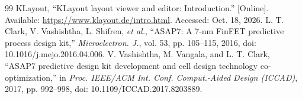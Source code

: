 \documentclass[preprint,12pt,number]{elsarticle}
\begin{document}
\begin{thebibliography}{99}
 KLayout, ``KLayout layout viewer and editor: Introduction.'' [Online]. Available: \url{https://www.klayout.de/intro.html}. Accessed: Oct. 18, 2026.
 L. T. Clark, V. Vashishtha, L. Shifren, \emph{et al.}, ``ASAP7: A 7-nm FinFET predictive process design kit,'' \emph{Microelectron. J.}, vol. 53, pp. 105--115, 2016, doi: 10.1016/j.mejo.2016.04.006.
 V. Vashishtha, M. Vangala, and L. T. Clark, ``ASAP7 predictive design kit development and cell design technology co-optimization,'' in \emph{Proc. IEEE/ACM Int. Conf. Comput.-Aided Design (ICCAD)}, 2017, pp. 992--998, doi: 10.1109/ICCAD.2017.8203889.
\end{thebibliography}


\end{document}
